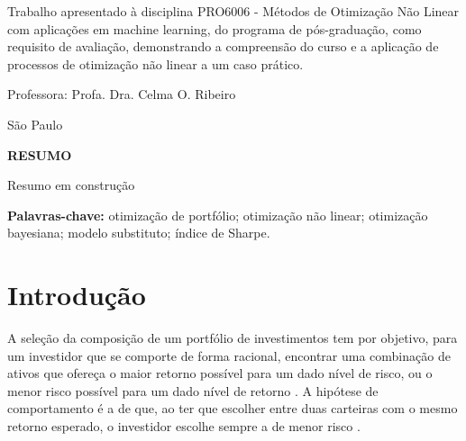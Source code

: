 \documentclass[12pt,a4paper]{article}
\begin{document}
\begin{flushright}
\begin{minipage}{8cm}
{\fontsize{12}{14}\selectfont
Trabalho apresentado à disciplina PRO6006 - Métodos de Otimização Não Linear com aplicações em machine learning, do programa de pós-graduação, como requisito de avaliação, demonstrando a compreensão do curso e a aplicação de processos de otimização não linear a um caso prático.}

\vspace{1cm}

{\fontsize{12}{14}\selectfont Professora: Profa. Dra. Celma O. Ribeiro}
\end{minipage}
\end{flushright}

\vfill

\begin{center}
{\fontsize{12}{14}\selectfont São Paulo}\\[4pt]
{\fontsize{12}{14}\selectfont \the\year}
\end{center}

\newpage
\thispagestyle{pretextual}
\begin{center}
{\fontsize{12}{14}\bfseries RESUMO}
\end{center}
\vspace{1em}

\noindent
Resumo em construção

\vspace{1em}
\noindent
\textbf{Palavras-chave:} otimização de portfólio; otimização não linear; otimização bayesiana; modelo substituto; índice de Sharpe.

\newpage
\thispagestyle{pretextual}
\tableofcontents

\newpage
\pagestyle{fancy}
\thispagestyle{plain}

\section{Introdução}

A seleção da composição de um portfólio de investimentos tem por objetivo, para um investidor que se comporte de forma racional, encontrar uma combinação de ativos que ofereça o maior retorno possível para um dado nível de risco, ou o menor risco possível para um dado nível de retorno \cite{markowitz1952portfolio}. A hipótese de comportamento é a de que, ao ter que escolher entre duas carteiras com o mesmo retorno esperado, o investidor escolhe sempre a de menor risco \cite{markowitz1952portfolio}.
\end{document}
